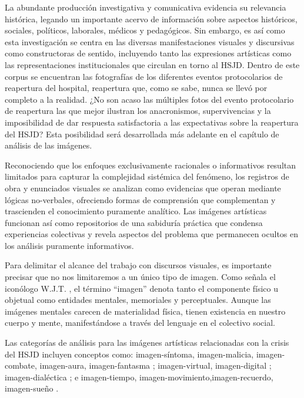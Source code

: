 La abundante producción investigativa y comunicativa evidencia su relevancia histórica, legando un importante acervo de información sobre aspectos históricos, sociales, políticos, laborales, médicos y pedagógicos. Sin embargo,  \textcolor{edit30sept}{es así como esta} investigación se centra en las diversas manifestaciones visuales y discursivas como constructoras de sentido, incluyendo tanto las expresiones artísticas como las representaciones institucionales que circulan en torno al HSJD. Dentro de este corpus se encuentran las fotografías de los diferentes eventos protocolarios de reapertura del hospital, reapertura que, como se sabe, nunca se llevó por completo a la realidad. ¿No son acaso las múltiples fotos del evento protocolario de reapertura las que mejor ilustran los anacronismos, supervivencias y la imposibilidad de dar respuesta satisfactoria a las expectativas sobre la reapertura del HSJD? Esta posibilidad será desarrollada más adelante en el capítulo de análisis de las imágenes.

Reconociendo que los enfoques exclusivamente racionales o informativos resultan limitados para capturar la complejidad sistémica del fenómeno, los registros de obra y enunciados visuales se analizan como evidencias que operan mediante lógicas no-verbales, ofreciendo formas de comprensión que complementan y trascienden el conocimiento puramente analítico. Las imágenes artísticas funcionan así como repositorios de una sabiduría práctica que condensa experiencias colectivas y revela aspectos del problema que permanecen ocultos en los análisis puramente informativos. 

Para delimitar el alcance del trabajo con discursos visuales, es importante precisar que no nos limitaremos a un único tipo de imagen. Como señala el iconólogo W.J.T. \parencite{Mitchell2005}, el término ``imagen'' denota tanto el componente físico u objetual como entidades mentales, memoriales y perceptuales. Aunque las imágenes mentales carecen de materialidad física, tienen existencia en nuestro cuerpo y mente, manifestándose a través del lenguaje en el colectivo social.

Las categorías de análisis para las imágenes artísticas relacionadas con la crisis del HSJD incluyen conceptos como: imagen-síntoma, imagen-malicia, imagen-combate, imagen-aura, imagen-fantasma \parencite{DidiHuberman2011}; imagen-virtual, imagen-digital \parencite{Manovich2005}; imagen-dialéctica \parencite{Benjamin2004}; e imagen-tiempo, imagen-movimiento,\linebreak[0] imagen-recuerdo, imagen-sueño \parencite{Deleuze1985}.

